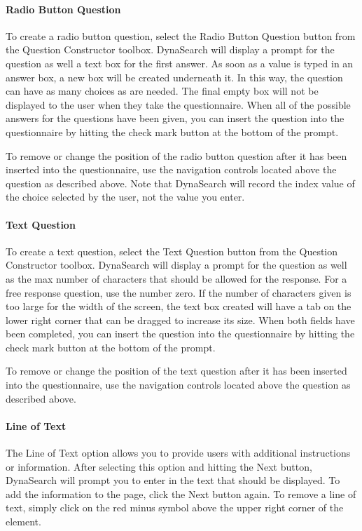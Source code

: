 \documentclass[article]{ij4uq}              %
\begin{document}
\paragraph{Radio Button Question}
To create a radio button question, select the Radio Button Question button from the Question Constructor toolbox. DynaSearch will display a prompt for the question as well a text box for the first answer.  As soon as a value is typed in an answer box, a new box will be created underneath it.  In this way, the question can have as many choices as are needed.  The final empty box will not be displayed to the user when they take the questionnaire.  When all of the possible answers for the questions have been given, you can insert the question into the questionnaire by hitting the check mark button at the bottom of the prompt.

To remove or change the position of the radio button question after it has been inserted into the questionnaire, use the navigation controls located above the question as described above.  Note that DynaSearch will record the index value of the choice selected by the user, not the value you enter. 

\paragraph{Text Question}
To create a text question, select the Text Question button from the Question Constructor toolbox.  DynaSearch will display a prompt for the question as well as the max number of characters that should be allowed for the response.   For a free response question, use the number zero.  If the number of characters given is too large for the width of the screen, the text box created will have a tab on the lower right corner that can be dragged to increase its size.  When both fields have been completed, you can insert the question into the questionnaire by hitting the check mark button at the bottom of the prompt.

To remove or change the position of the text question after it has been inserted into the questionnaire, use the navigation controls located above the question as described above. 

\paragraph{Line of Text}
The Line of Text option allows you to provide users with additional instructions or information. After selecting this option and hitting the Next button, DynaSearch will prompt you to enter in the text that should be displayed. To add the information to the page, click the Next button again. To remove a line of text, simply click on the red minus symbol above the upper right corner of the element.
\end{document}
